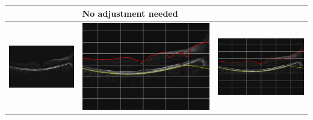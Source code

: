 \documentclass[12pt,a4paper]{scrartcl}
\begin{document}
\begin{table}[H]
\begin{tabular}{ | m{5cm} | m{5cm} | m{5cm} | }
\begin{minipage}{.3\textwidth}
    \end{minipage}
    & 
     No adjustment needed
    \\ \hline%
    \begin{minipage}{.3\textwidth}
      \includegraphics[width=\linewidth]{./images/TableOCT/base2.jpeg}
    \end{minipage}
    &
     \begin{minipage}{.3\textwidth}
      \includegraphics[width=\linewidth]{./images/TableOCT/ILM_BM_2.png}
    \end{minipage}
    & 
     \begin{minipage}{.3\textwidth}
      \includegraphics[width=\linewidth]{./images/TableOCT/ILM_BM_2_15_15.png}

\end{minipage}
\end{tabular}
\end{table}
\end{document}
